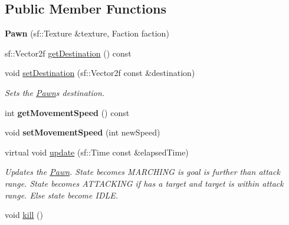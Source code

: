\subsection*{Public Member Functions}
\begin{DoxyCompactItemize}
\item 
\hypertarget{class_pawn_a0e5a39bb4a43ba3ce8848b2e9055c5b0}{}{\bfseries Pawn} (sf\+::\+Texture \&texture, Faction faction)\label{class_pawn_a0e5a39bb4a43ba3ce8848b2e9055c5b0}

\item 
sf\+::\+Vector2f \hyperlink{class_pawn_a27c4b05b5e5dc303d5c9a838cc96a7cf}{get\+Destination} () const 
\item 
void \hyperlink{class_pawn_a866b60201664eb6a0c743afa13ee5ccb}{set\+Destination} (sf\+::\+Vector2f const \&destination)
\begin{DoxyCompactList}\small\item\em Sets the \hyperlink{class_pawn}{Pawn}\textquotesingle{}s destination. \end{DoxyCompactList}\item 
\hypertarget{class_pawn_a757e87fbd789d00549e38c1eaa17f0c4}{}int {\bfseries get\+Movement\+Speed} () const \label{class_pawn_a757e87fbd789d00549e38c1eaa17f0c4}

\item 
\hypertarget{class_pawn_a37f3801cb4e6100ab126d438f2abe786}{}void {\bfseries set\+Movement\+Speed} (int new\+Speed)\label{class_pawn_a37f3801cb4e6100ab126d438f2abe786}

\item 
virtual void \hyperlink{class_pawn_a36bf19ac850570a5e82142e01d3aab67}{update} (sf\+::\+Time const \&elapsed\+Time)
\begin{DoxyCompactList}\small\item\em Updates the \hyperlink{class_pawn}{Pawn}. State becomes M\+A\+R\+C\+H\+I\+N\+G is goal is further than attack range. State becomes A\+T\+T\+A\+C\+K\+I\+N\+G if has a target and target is within attack range. Else state become I\+D\+L\+E. \end{DoxyCompactList}\item 
\hypertarget{class_pawn_a28ab485f127ce43f33c026300283c546}{}void \hyperlink{class_pawn_a28ab485f127ce43f33c026300283c546}{kill} ()\label{class_pawn_a28ab485f127ce43f33c026300283c546}


\end{DoxyCompactItemize}

